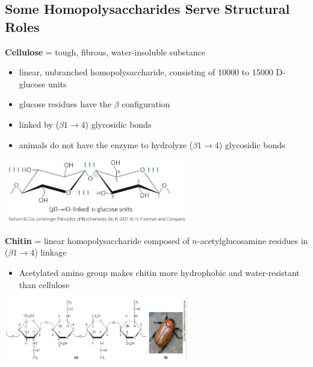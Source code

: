 \documentclass[10pt]{article}
\begin{document}
\subsection*{Some Homopolysaccharides Serve Structural Roles}
\textbf{Cellulose} = tough, fibrous, water-insoluble substance
\begin{itemize}
    \item linear, unbranched homopolysaccharide, consisting of 10000 to 15000 D-glucose units
    \item glucose residues have the $\beta$ configuration
    \item linked by ($\beta 1 \rightarrow 4$) glycosidic bonds
    \item animals do not have the enzyme to hydrolyze ($\beta 1 \rightarrow 4$) glycosidic bonds
\end{itemize}
\begin{center}
    \includegraphics*[width=0.6\textwidth]{L1_22.png}
\end{center}
\textbf{Chitin} = linear homopolysaccharide composed of $n$-acetylglucosamine residues in ($\beta 1 \rightarrow 4$) linkage
\begin{itemize}
    \item Acetylated amino group makes chitin more hydrophobic and water-resistant than cellulose
\end{itemize}
\begin{center}
    \includegraphics*[width=0.6\textwidth]{L1_23.png}
\end{center}
\end{document}
